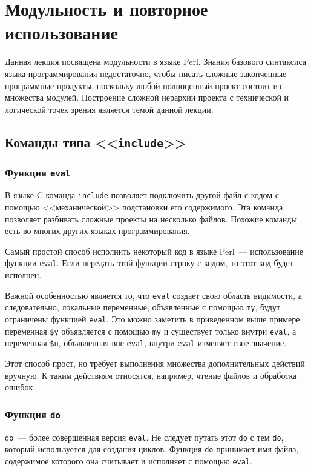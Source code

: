 \setcounter{chapter}{2}
\chapter{Модульность и повторное использование}
Данная лекция посвящена модульности в языке Perl. Знания базового синтаксиса языка программирования недостаточно, чтобы писать сложные законченные программные продукты, поскольку любой полноценный проект состоит из множества модулей. Построение сложной иерархии проекта с технической и логической точек зрения является темой данной лекции.

\section{Команды типа <<\texttt{include}>>} %

\subsection{Функция \texttt{eval}}
В языке C команда \verb|include| позволяет подключить другой файл с кодом с помощью <<механической>> подстановки его содержимого. Эта команда позволяет разбивать сложные проекты на несколько файлов.
Похожие команды есть во многих других языках программирования.

Самый простой способ исполнить некоторый код в языке Perl~--- использование функции \verb|eval|. Если передать этой функции строку с кодом, то этот код будет исполнен.

Важной особенностью является то, что \verb|eval| создает свою область видимости, а следовательно, локальные переменные, объявленные с помощью \verb|my|, будут ограничены функцией \verb|eval|. Это можно заметить в приведенном выше примере: переменная \verb|$y| объявляется с помощью \verb|my| и существует только внутри \verb|eval|, а переменная \verb|$u|, объявленная вне \verb|eval|, внутри \verb|eval| изменяет свое значение.

Этот способ прост, но требует выполнения множества дополнительных действий вручную. К таким действиям относятся, например, чтение файлов и обработка ошибок.

\subsection{Функция \texttt{do}} %
\verb|do|~--- более совершенная версия \verb|eval|. Не следует путать этот \verb|do| с тем \verb|do|, который используется для создания циклов.
Функция \verb|do| принимает имя файла, содержимое которого она
считывает и исполняет с помощью \verb|eval|.

